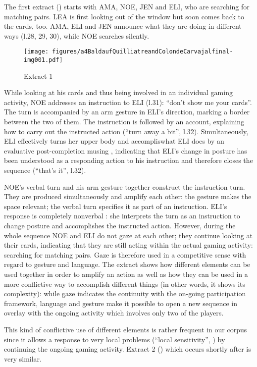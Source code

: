 \documentclass[output=paper]{langscibook}
\begin{document}
The first extract () starts with AMA, NOE, JEN and ELI, who are searching for matching pairs. LEA is first looking out of the window but soon comes back to the cards, too. AMA, ELI and JEN announce what they are doing in different ways (l.28, 29, 30), while NOE searches silently. 


\begin{figure}[p]
\caption{Extract 1\label{fig:13:extract1}}
\texttt{[image: figures/a4BaldaufQuilliatreandColondeCarvajalfinal-img001.pdf]}
\end{figure}

While looking at his cards and thus being involved in an individual gaming activity, NOE addresses an instruction to ELI (l.31): “don’t show me your cards”. The turn is accompanied by an arm gesture in ELI’s direction, marking a border between the two of them. The instruction is followed by an account, explaining how to carry out the instructed action (“turn away a bit”, l.32). Simultaneously, ELI effectively turns her upper body and accompliswhat ELI does by an evaluative post-completion musing \citep{Schegloff2007}, indicating that ELI’s change in posture has been understood as a responding action to his instruction and therefore closes the sequence (“that’s it”, l.32). 

NOE’s verbal turn and his arm gesture together construct the instruction turn. They are produced simultaneously and amplify each other: the gesture makes the space relevant; the verbal turn specifies it as part of an instruction. ELI’s response is completely nonverbal \citep{Keevalik2018}: she interprets the turn as an instruction to change posture and accomplishes the instructed action. However, during the whole sequence NOE and ELI do not gaze at each other; they continue looking at their cards, indicating that they are still acting within the actual gaming activity: searching for matching pairs. Gaze is therefore used in a competitive sense with regard to gesture and language. The extract shows how different elements can be used together in order to amplify an action as well as how they can be used in a more conflictive way to accomplish different things (in other words, it shows its complexity): while gaze indicates the continuity with the on-going participation framework, language and gesture make it possible to open a new sequence in overlay with the ongoing activity which involves only two of the players.

This kind of conflictive use of different elements is rather frequent in our corpus since it allows a response to very local problems (“local sensitivity”, \citealt{Bergmann1990}) by continuing the ongoing gaming activity. Extract 2 () which occurs shortly after is very similar.
\end{document}

